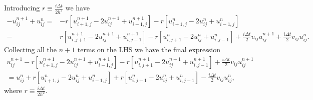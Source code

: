 \documentclass[english,notitlepage,reprint,nofootinbib]{revtex4-1}  %
\begin{document}
Introducing  $r \equiv \frac{i \Delta t}{2h^2}$ we have
\begin{align}
    - u_{ij}^{n+1} + u_{ij}^n 
    =& - r \left[ {u_{i+1,j}^{n+1} -2u_{ij}^{n+1} + u_{i-1,j}^{n+1}} \right]
    - r \left[ {u_{i+1,j}^{n} -2u_{ij}^{n} + u_{i-1,j}^{n}}\right] \\
    -& r \left[ {u_{i,j+1}^{n+1} -2u_{ij}^{n+1} + u_{i,j-1}^{n+1}} \right]
    - r \left[ {u_{i,j+1}^{n} -2u_{ij}^{n} + u_{i,j-1}^{n}}\right]
    + \frac{i\Delta t}{2} v_{ij}u_{ij}^{n+1} + \frac{i\Delta t}{2} v_{ij}u_{ij}^n. 
\end{align}
Collecting all the $n+1$ terms on the LHS we have the final expression
\begin{align}
    u_{ij}^{n+1} - r \left[ u_{i+1,j}^{n+1}- 2 u_{ij}^{n+1} + u_{i-1,j}^{n+1} \right] 
    - r \left[ u_{i,j+1}^{n+1}- 2 u_{ij}^{n+1} + u_{i,j-1}^{n+1} \right] 
    + \frac{i \Delta t}{2} v_{ij} u_{ij}^{n+1} \\
    = u_{ij}^n 
    + r \left[ u_{i+1,j}^{n}- 2 u_{ij}^{n} + u_{i-1,j}^{n} \right] 
    + r \left[ u_{i,j+1}^{n}- 2 u_{ij}^{n} + u_{i,j-1}^{n} \right]
    - \frac{i \Delta t}{2} v_{ij} u_{ij}^{n},
\end{align}
where $r \equiv \frac{i \Delta t}{2h^2}$. 
\end{document}
